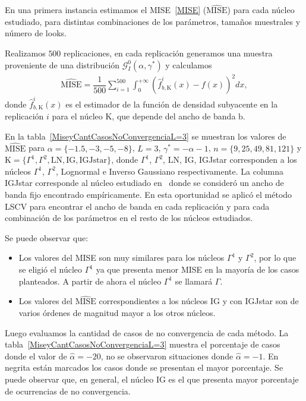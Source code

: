 En una primera instancia estimamos el MISE~\eqref{MISE} ($\widehat{\text{MISE}}$) para cada núcleo estudiado, para distintas combinaciones de los parámetros, tamaños muestrales y número de looks. 

Realizamos $500$ replicaciones, en cada replicación generamos una muestra proveniente de una distribución $\mathcal{G}_I^0(\alpha,\gamma^*)$ y calculamos 
\begin{align}
\label{MiseEst}
\widehat{\text{MISE}}=\dfrac{1}{500} \sum_{i=1}^{500}\int_0^{+\infty} (\widehat{f}_{b,\text{K}}^i(x)-f(x))^2 dx,
\end{align}
donde $\widehat{f}_{b,\text{K}}^i(x)$ es el estimador de la función de densidad subyacente en la replicación $i$ para el núcleo $\text{K}$, que depende del ancho de banda $\text{b}$.

En la tabla~\ref{MiseyCantCasosNoConvergenciaL=3} se muestran los valores de $\widehat{\text{MISE}}$ para $\alpha=\{-1.5,-3,-5,-8\}$, $L=3$, $\gamma^*=-\alpha-1$, $n=\{9,25,49,81,121\}$ y $\text{K}=\{\Gamma^1,\Gamma^2,\text{LN},\text{IG},\text{IGJstar\}}$, donde $\Gamma^1$, $\Gamma^2$, LN, IG, IGJstar corresponden a los núcleos $\Gamma^1$, $\Gamma^2$, Lognormal e Inverso Gaussiano respectivamente. La columna IGJstar corresponde al núcleo estudiado en~\cite{gambini2015} donde se consideró un ancho de banda fijo encontrado empíricamente. En esta oportunidad se aplicó el método LSCV para encontrar el ancho de banda en cada replicación y para cada combinación de los parámetros en el resto de los núcleos estudiados.

Se puede observar que:
\begin{itemize}
	\item Los valores del MISE son muy similares para los núcleos $\Gamma^1$ y $\Gamma^2$, por lo que se eligió el núcleo $\Gamma^1$ ya que presenta menor MISE en la mayoría de los casos planteados. A partir de ahora el núcleo $\Gamma^1$ se llamará $\Gamma$.
	\item Los valores del $\widehat{\text{MISE}}$ correspondientes a los núcleos IG y con IGJstar son de varios órdenes de magnitud mayor a los otros núcleos.
\end{itemize} 

Luego evaluamos la cantidad de casos de no convergencia de cada método. La tabla~\ref{MiseyCantCasosNoConvergenciaL=3} muestra el porcentaje de casos donde el valor de $\widehat{\alpha}=-20$, no se observaron situaciones donde $\widehat{\alpha}=-1.$ En negrita están marcados los casos donde se presentan el mayor porcentaje. Se puede observar que, en general, el núcleo IG es el que presenta mayor porcentaje de ocurrencias de no convergencia.

